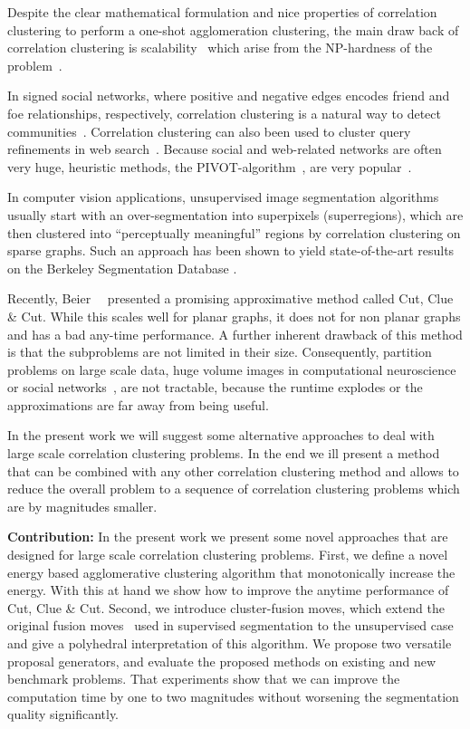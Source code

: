 \documentclass[10pt,twocolumn,letterpaper]{article}
\begin{document}
Despite the clear mathematical formulation and nice properties of correlation clustering
to perform a one-shot agglomeration clustering,
the main draw back of correlation clustering is scalability~\cite{nunez_iglesias_2013}
which arise from the NP-hardness of the problem~\cite{Bansal-2002}.

In signed social networks, where positive and negative edges encodes friend and foe relationships, respectively,
correlation clustering is a natural way to detect communities~\cite{Chierichetti-2014,Chen-2012}.
Correlation clustering can also been used to cluster query refinements in web search~\cite{Sadikov-2010}.
Because social and web-related networks are often very huge, heuristic methods, \eg the PIVOT-algorithm~\cite{Ailon-2008},
are very popular~\cite{Chierichetti-2014}.

In computer vision applications, unsupervised image segmentation algorithms usually start with an over-segmentation
into superpixels (superregions), which are then clustered into ``perceptually meaningful''
regions by correlation clustering on sparse graphs.
Such an approach has been shown to yield
state-of-the-art results on the Berkeley Segmentation Database
\cite{andres_2011_iccv,yarkony_2012_eccv,alush_2013_simbad}.

Recently, Beier~\etal~\cite{beier_2014_cvpr} presented a promising 
approximative method called Cut, Clue \& Cut.
While this scales well for planar graphs, it does not for non planar graphs and has a bad any-time performance.
A further inherent drawback of this method is that the subproblems are not limited in their size.
%
Consequently, partition problems on large scale data, \eg
huge volume images in computational neuroscience~\cite{kroeger_2012_eccv}
or social networks~\cite{Leskovec-2010}, 
are not tractable, because the runtime explodes or the 
approximations are far away from being useful.

In the present work we will suggest some alternative approaches to deal with large scale correlation clustering problems.
In the end we ill present a method that can be combined with any other correlation clustering method and 
allows to reduce the overall problem to a sequence of correlation clustering problems which are by magnitudes smaller.


\textbf{Contribution:}
In the present work we present some novel approaches that are designed for large scale correlation clustering problems.
First, we define a novel energy based agglomerative clustering algorithm that monotonically increase the energy.
With this at hand we show how to improve the anytime performance of Cut, Clue \& Cut.
Second, we introduce cluster-fusion moves, which extend the original fusion moves~\cite{Lempitsky-2010} 
used in supervised segmentation to the unsupervised case and give a polyhedral interpretation of this algorithm.
We propose two versatile proposal generators, and evaluate the proposed methods on existing and new benchmark problems.
That experiments show that we can improve the computation time by one to two magnitudes without worsening the segmentation 
quality significantly.
\end{document}

